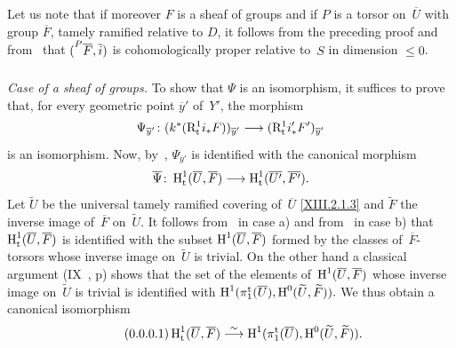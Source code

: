 Let us note that if moreover $F$ is a sheaf of groups and if $P$ is a
torsor on~$\overline{U}$ with group $\overline{F}$,
tamely ramified relative to $D$, it follows
from the preceding proof and from~ that
$(\leftexp{P}{\overline{F}},\overline{i})$ is cohomologically
proper relative to~$S$ in dimension $\leq 0$.

\subsubsection{}
\label{XIII.2.4.3}
\emph{Case of a sheaf of groups.} To show that $\Psi$ is an
isomorphism, it suffices to prove that, for every geometric
point $\overline{y}'$ of~$Y'$, the morphism
$$
\Psi_{\overline{y}'}\colon
(k^*(\R^1_{\tame}i_*F))_{\overline{y}'}\to (\R^1_{\tame}
i_*'F')_{\overline{y}'}
$$
is an isomorphism. Now, by~,
$\Psi_{\overline{y}'}$ is identified with the canonical morphism
$$
\overline{\Psi}\colon
\H^1_{\tame}(\overline{U},\overline{F})\to
\H^1_{\tame}(\overline{U'},\overline{F'}).
$$
Let $\widetilde{U}$ be the universal tamely
ramified covering of~$\overline{U}$ \eqref{XIII.2.1.3} and $\widetilde{F}$
the inverse image of~$\overline{F}$ on~$\widetilde{U}$. It follows
from~ in case a) and from~ in case b)
that $\operatorname{H}^1_{\mathrm{t}}(\overline{U},\overline{F})$ is identified with the
subset $\operatorname{H}^1(\overline{U},\overline{F})$ formed by the classes
of~$\overline{F}$-torsors whose inverse image on~$\widetilde{U}$
is trivial. On the other hand a
classical argument (\cf IX~, p\ptbl\pageref{page-300})
shows that
the set of the elements of~$\operatorname{H}^1(\overline{U},\overline{F})$
whose inverse image on~$\widetilde{U}$ is trivial is identified
with
$\operatorname{H}^1(\pi_1^{\mathrm{t}}(\overline{U}),\operatorname{H}^0(\widetilde{U},\widetilde{F})).$
We thus obtain a canonical isomorphism
\begin{equation*}
\label{eq:XIII.2.4.3.1} \tag{\thesubsubsection.1} {}
\H^1_{\tame}(\overline{U},\overline{F})\isomto
\H^1(\pi_1^{\tame}(\overline{U}),\H^0(\widetilde{U},\widetilde{F})).
\end{equation*}

